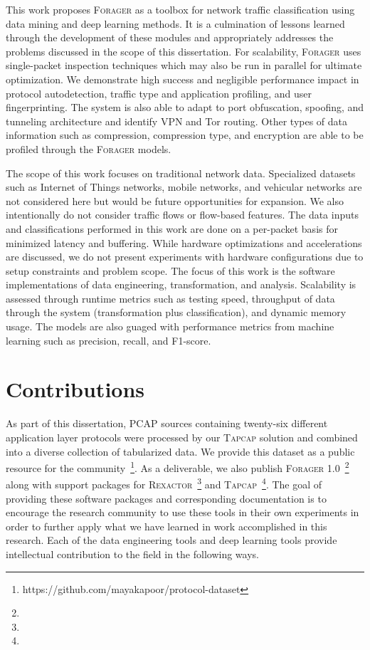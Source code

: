 This work proposes \textsc{Forager} as a toolbox for network traffic classification using data mining and deep learning methods. It is a culmination of lessons learned through the development of these modules and appropriately addresses the problems discussed in the scope of this dissertation. For scalability, \textsc{Forager} uses single-packet inspection techniques which may also be run in parallel for ultimate optimization. We demonstrate high success and negligible performance impact in protocol autodetection, traffic type and application profiling, and user fingerprinting. The system is also able to adapt to port obfuscation, spoofing, and tunneling architecture and identify VPN and Tor routing. Other types of data information such as compression, compression type, and encryption are able to be profiled through the \textsc{Forager} models.

The scope of this work focuses on traditional network data. Specialized datasets such as Internet of Things networks, mobile networks, and vehicular networks are not considered here but would be future opportunities for expansion. We also intentionally do not consider traffic flows or flow-based features. The data inputs and classifications performed in this work are done on a per-packet basis for minimized latency and buffering. While hardware optimizations and accelerations are discussed, we do not present experiments with hardware configurations due to setup constraints and problem scope. The focus of this work is the software implementations of data engineering, transformation, and analysis. Scalability is assessed through runtime metrics such as testing speed, throughput of data through the system (transformation plus classification), and dynamic memory usage. The models are also guaged with performance metrics from machine learning such as precision, recall, and F1-score.

\section{Contributions}

As part of this dissertation, PCAP sources containing twenty-six different application layer protocols were processed by our \textsc{Tapcap} solution and combined into a diverse collection of tabularized data. We provide this dataset as a public resource for the community~\footnote{https://github.com/mayakapoor/protocol-dataset}. As a deliverable, we also publish \textsc{Forager 1.0}~\footnote{} along with support packages for \textsc{Rexactor}~\footnote{} and \textsc{Tapcap}~\footnote{}. The goal of providing these software packages and corresponding documentation is to encourage the research community to use these tools in their own experiments in order to further apply what we have learned in work accomplished in this research. Each of the data engineering tools and deep learning tools provide intellectual contribution to the field in the following ways.

